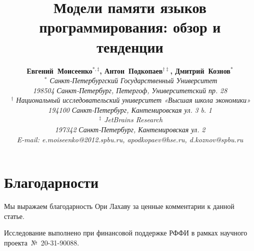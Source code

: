 \documentclass[a4paper,twoside,11pt]{article}
\author{
{\bfseries Евгений~Моисеенко$^{*, \ddagger}$, Антон~Подкопаев$^{\dagger \ddagger}$, Дмитрий~Кознов$^{*}$}
\\ {\itshape $~^{*}$ Санкт-Петербургский Государственный Университет}
\\ {\slshape 198504} {\itshape Санкт-Петербург, Петергоф, Университетский пр.} {\slshape 28}
\\ {\itshape $~^{\dagger}$ Национальный исследовательский университет «Высшая школа экономики»}
\\ {\slshape 194100} {\itshape Санкт-Петербург, Кантемировская ул.} {\slshape 3} {\itshape b.} {\slshape 1}
\\ {\itshape $~^{\ddagger}$ JetBrains Research}
\\ {\slshape 197342} {\itshape Санкт-Петербург, Кантемировская ул.} {\slshape 2}
\\ {\itshape E-mail: e.moiseenko@2012.spbu.ru, apodkopaev@hse.ru, d.koznov@spbu.ru}}
\title{Модели памяти языков программирования: обзор и тенденции}
\date{}
\numberwithin{equation}{section}
\begin{document}
\maketitle











\section*{Благодарности}

Мы выражаем благодарность Ори Лахаву за ценные комментарии к данной статье. 

Исследование выполнено при финансовой поддержке РФФИ в рамках научного проекта~№~20-31-90088. \\

 
%  




\clearpage
\appendix


\end{document}
